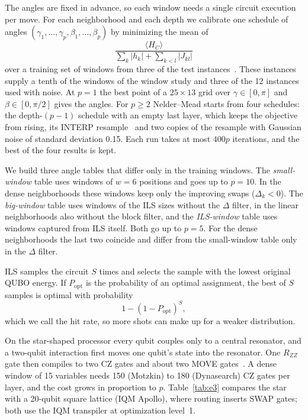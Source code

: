 \documentclass[runningheads]{llncs}
\begin{document}
The angles are fixed in advance, so each window needs a single circuit
execution per move. For each neighborhood and each depth we calibrate one
schedule of angles $(\gamma_1, \dots, \gamma_p, \beta_1, \dots, \beta_p)$ by
minimizing
the mean of
\begin{equation}
  \frac{\langle H_C \rangle}{\sum_k |h_k| + \sum_{k<l} |J_{kl}|}
\end{equation}
over a
training set of windows from three of the test instances~\cite{taillard1993}.
These instances supply a tenth of the windows of the window study and three
of the 12 instances used with noise. At $p = 1$ the best
point of a $25 \times 13$ grid over $\gamma \in [0, \pi]$ and
$\beta \in [0, \pi/2]$ gives the angles. For $p \ge 2$ Nelder--Mead starts
from four schedules: the depth-$(p-1)$ schedule with an empty last layer,
which keeps the objective from rising, its INTERP resample~\cite{zhou2020}
and two copies of the resample with Gaussian noise of standard deviation
0.15. Each run takes at most $400p$ iterations, and the best of the four
results is kept.

We build three angle tables that differ only in the training windows. The
\emph{small-window} table uses windows of $w = 6$ positions and goes up to
$p = 10$. In the dense neighborhoods these windows keep only the improving
swaps ($\Delta_k < 0$). The \emph{big-window} table uses windows of the ILS
sizes without the $\Delta$ filter, in the linear neighborhoods also without
the block filter, and the \emph{ILS-window} table uses windows captured from
ILS itself. Both go up to $p = 5$. For the dense neighborhoods the last two
coincide and differ from the small-window table only in the $\Delta$ filter.

ILS samples the circuit $S$ times and selects the sample with the lowest
original QUBO energy. If $P_{\mathrm{opt}}$ is the probability of an optimal
assignment, the best of $S$ samples is optimal with probability
\begin{equation}
  1 - (1 - P_{\mathrm{opt}})^S ,
\end{equation}
which we call the hit rate, so more shots
can make up for a weaker distribution.

On the star-shaped processor every qubit couples only to a central
resonator, and a two-qubit interaction first moves one qubit's state into the
resonator. One $R_{ZZ}$ gate then compiles to two CZ gates and about two
MOVE gates~\cite{gnatowski2026routing}. A dense window of 15 variables needs
150 (Motzkin) to 180 (Dynasearch) CZ gates per layer, and the cost grows in
proportion to $p$.
Table~\ref{tab:e3} compares the star with a 20-qubit square lattice (IQM
Apollo), where routing inserts SWAP gates; both use the IQM transpiler at
optimization level~1.
\end{document}
